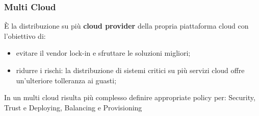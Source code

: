 \subsubsection{Multi Cloud}\label{sub:ftt_multi_cloud} %
È la distribuzione su più \textbf{cloud provider} della propria piattaforma cloud con l'obiettivo di:
\begin{itemize}
    \item evitare il vendor lock-in e sfruttare le soluzioni migliori;
    \item ridurre i rischi: la distribuzione di sistemi critici su più servizi cloud offre un'ulteriore tolleranza ai guasti;
\end{itemize}
\begin{note}
    In un multi cloud risulta più complesso definire appropriate policy per: Security, Trust e Deploying, Balancing e Provisioning
\end{note}
%
